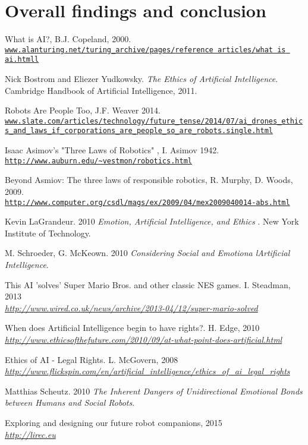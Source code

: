 \documentclass[article]{IEEEtran}
\begin{document}
\section{Overall findings and conclusion}

\begin{thebibliography}{9}

What is AI?, B.J. Copeland, 2000.
\\\texttt{\url{www.alanturing.net/turing_archive/pages/reference articles/what is ai.htmll}}

Nick Bostrom and Eliezer Yudkowsky. 
\textit{The Ethics of Artificial Intelligence}. 
Cambridge Handbook of Artificial Intelligence, 2011.

Robots Are People Too, J.F. Weaver 2014.
\\\texttt{\url{www.slate.com/articles/technology/future_tense/2014/07/ai_drones_ethics_and_laws_if_corporations_are_people_so_are_robots.single.html}}

Isaac Asimov's "Three Laws of Robotics" , I. Asimov 1942.
\\\texttt{\url{http://www.auburn.edu/~vestmon/robotics.html}}

Beyond Asmiov: The three laws of responsible robotics, R. Murphy, D. Woods, 2009.
\\\texttt{\url{http://www.computer.org/csdl/mags/ex/2009/04/mex2009040014-abs.html}}

Kevin LaGrandeur. 2010
\textit{Emotion, Artificial Intelligence, and Ethics }. 
New York Institute of Technology.

M. Schroeder, G. McKeown. 2010
\textit{Considering Social and Emotiona lArtiﬁcial Intelligence}.

This AI 'solves' Super Mario Bros. and other classic NES games. I. Steadman, 2013
\\\textit{\url{ http://www.wired.co.uk/news/archive/2013-04/12/super-mario-solved}}

When does Artificial Intelligence begin to have rights?. H. Edge, 2010
\\\textit{\url{ http://www.ethicsofthefuture.com/2010/09/at-what-point-does-artificial.html}}

Ethics of AI - Legal Rights. L. McGovern, 2008
\\\textit{\url{http://www.flickspin.com/en/artificial_intelligence/ethics_of_ai_legal_rights}}

Matthias Scheutz. 2010
\textit{The Inherent Dangers of Unidirectional Emotional Bonds between Humans and Social Robots}. 

Exploring and designing our future robot companions, 2015
\\\textit{\url{http://lirec.eu}}

\end{thebibliography}
\end{document}
